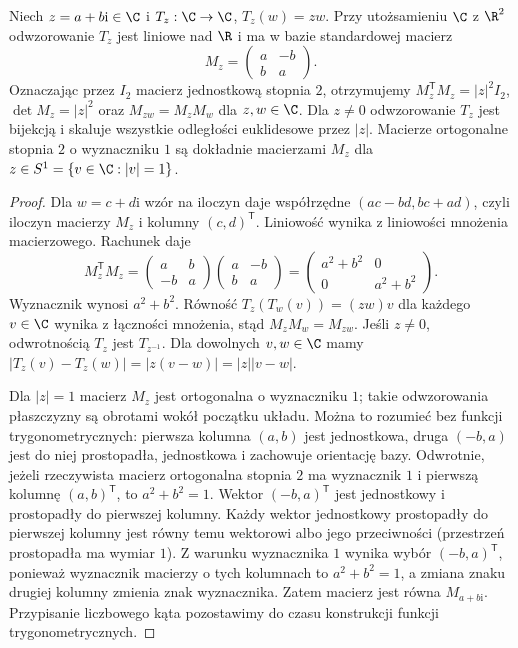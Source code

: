 \begin{stwierdzenie}
\label{ma1:prop:complex-multiplication-matrix}
Niech $z=a+b\mathrm i\in\C$ i $T_z:\C\to\C$, $T_z(w)=zw$. Przy utożsamieniu $\C$ z $\R^2$ odwzorowanie $T_z$ jest liniowe nad $\R$ i ma w bazie standardowej macierz
\[
 M_z=\begin{pmatrix}a&-b\\b&a\end{pmatrix}.
\]
Oznaczając przez $I_2$ macierz jednostkową stopnia $2$, otrzymujemy $M_z^\mathsf{T}M_z=|z|^2 I_2$, $\det M_z=|z|^2$ oraz $M_{zw}=M_zM_w$ dla $z,w\in\C$. Dla $z\ne0$ odwzorowanie $T_z$ jest bijekcją i skaluje wszystkie odległości euklidesowe przez $|z|$. Macierze ortogonalne stopnia $2$ o wyznaczniku $1$ są dokładnie macierzami $M_z$ dla $z\in S^1=\{v\in\C:|v|=1\}$.
\end{stwierdzenie}
\begin{proof}
Dla $w=c+d\mathrm i$ wzór na iloczyn daje współrzędne $(ac-bd,bc+ad)$, czyli iloczyn macierzy $M_z$ i kolumny $(c,d)^\mathsf{T}$. Liniowość wynika z liniowości mnożenia macierzowego. Rachunek daje
\[
 M_z^\mathsf{T}M_z=
 \begin{pmatrix}a&b\\-b&a\end{pmatrix}
 \begin{pmatrix}a&-b\\b&a\end{pmatrix}
 =\begin{pmatrix}a^2+b^2&0\\0&a^2+b^2\end{pmatrix}.
\]
Wyznacznik wynosi $a^2+b^2$. Równość $T_z(T_w(v))=(zw)v$ dla każdego $v\in\C$ wynika z łączności mnożenia, stąd $M_zM_w=M_{zw}$. Jeśli $z\ne0$, odwrotnością $T_z$ jest $T_{z^{-1}}$. Dla dowolnych $v,w\in\C$ mamy
$|T_z(v)-T_z(w)|=|z(v-w)|=|z||v-w|$.
 

Dla $|z|=1$ macierz $M_z$ jest ortogonalna o wyznaczniku $1$; takie odwzorowania płaszczyzny są obrotami wokół początku układu. Można to rozumieć bez funkcji trygonometrycznych: pierwsza kolumna $(a,b)$ jest jednostkowa, druga $(-b,a)$ jest do niej prostopadła, jednostkowa i zachowuje orientację bazy. Odwrotnie, jeżeli rzeczywista macierz ortogonalna stopnia $2$ ma wyznacznik $1$ i pierwszą kolumnę $(a,b)^\mathsf{T}$, to $a^2+b^2=1$. Wektor $(-b,a)^\mathsf{T}$ jest jednostkowy i prostopadły do pierwszej kolumny. Każdy wektor jednostkowy prostopadły do pierwszej kolumny jest równy temu wektorowi albo jego przeciwności (przestrzeń prostopadła ma wymiar $1$). Z warunku wyznacznika $1$ wynika wybór $(-b,a)^\mathsf{T}$, ponieważ wyznacznik macierzy o tych kolumnach to $a^2+b^2=1$, a zmiana znaku drugiej kolumny zmienia znak wyznacznika. Zatem macierz jest równa $M_{a+b\mathrm i}$. Przypisanie liczbowego kąta pozostawimy do czasu konstrukcji funkcji trygonometrycznych.
\end{proof}

